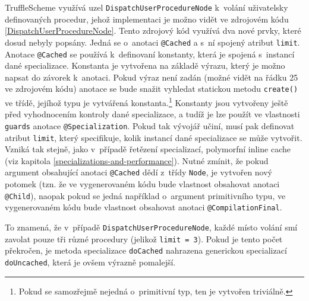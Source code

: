 \documentclass[
  master,
  biblatex,
  figures=true,
  theorems,
  sourcecodes,
  glossaries,
  index
]{kidiplom}
\begin{document}
TruffleScheme využívá uzel \texttt{DispatchUserProcedureNode} k~volání uživatelsky definovaných procedur, jehož implementaci je možno vidět ve zdrojovém kódu \ref{DispatchUserProcedureNode}. Tento zdrojový kód využívá dva nové prvky, které dosud nebyly popsány. Jedná se o~anotaci \texttt{@Cached} a s~ní spojený atribut \texttt{limit}. Anotace \texttt{@Cached} se používá k~definovaní konstanty, která je spojená s~instancí dané specializace. Konstanta je vytvořena na základě výrazu, který je možno napsat do závorek k~anotaci. Pokud výraz není zadán (možné vidět na řádku 25 ve zdrojovém kódu) anotace se bude snažit vyhledat statickou metodu \texttt{create()} ve třídě, jejíhož typu je vytvářená konstanta.\footnote{Pokud se samozřejmě nejedná o~primitivní typ, ten je vytvořen triviálně.} Konstanty jsou vytvořeny ještě před vyhodnocením kontroly dané specializace, a tudíž je lze použít ve vlastnosti \texttt{guards} anotace \texttt{@Specialization}. Pokud tak vývojář učiní, musí pak definovat atribut \texttt{limit}, který specifikuje, kolik instancí dané specializace se může vytvořit. Vzniká tak stejně, jako v~případě řetězení specializací, polymorfní inline cache (viz kapitola \ref{specializations-and-performance}). Nutné zmínit, že pokud argument obsahující anotaci \texttt{@Cached} dědí z~třídy \texttt{Node}, je vytvořen nový potomek (tzn. že ve vygenerovaném kódu bude vlastnost obsahovat anotaci \texttt{@Child}), naopak pokud se jedná například o~argument primitivního typu, ve vygenerovaném kódu bude vlastnost obsahovat anotaci \texttt{@CompilationFinal}. 

To znamená, že v~případě \texttt{DispatchUserProcedureNode}, každé místo volání smí zavolat pouze tři různé procedury (jelikož \texttt{limit = 3}). Pokud je tento počet překročen, je metoda specializace \texttt{doCached} nahrazena generickou specializací \texttt{doUncached}, která je ovšem výrazně pomalejší.
\end{document}
